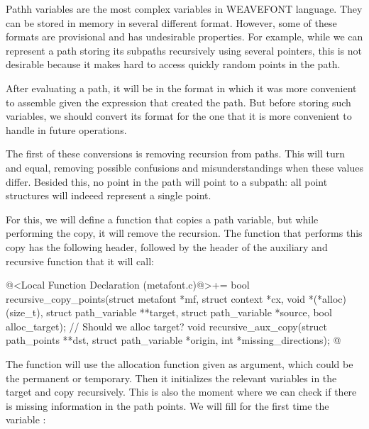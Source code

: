 
Pathh variables are the most complex variables in WEAVEFONT
language. They can be stored in memory in several different
format. However, some of these formats are provisional and has
undesirable properties. For example, while we can represent a path
storing its subpaths recursively using several pointers, this is not
desirable because it makes hard to access quickly random points in the
path.

After evaluating a path, it will be in the format in which it was more
convenient to assemble given the expression that created the path. But
before storing such variables, we should convert its format for the
one that it is more convenient to handle in future operations.

The first of these conversions is removing recursion from paths. This
will turn  and  equal,
removing possible confusions and misunderstandings when these values
differ. Besided this, no point in the path will point to a subpath:
all point structures will indeeed represent a single point.

For this, we will define a function that copies a path variable, but
while performing the copy, it will remove the recursion. The function
that performs this copy has the following header, followed by the
header of the auxiliary and recursive function that it will call:

\iniciocodigo
@<Local Function Declaration (metafont.c)@>+=
bool recursive_copy_points(struct metafont *mf, struct context *cx,
                           void *(*alloc)(size_t),
                           struct path_variable **target,
                           struct path_variable *source,
                           bool alloc_target); // Should we alloc target?
void recursive_aux_copy(struct path_points **dst,
                        struct path_variable *origin, int *missing_directions);
@
\fimcodigo

The function will use the allocation function given as argument, which
could be the permanent or temporary. Then it initializes the relevant
variables in the target and copy recursively. This is also the moment
where we can check if there is missing information in the path
points. We will fill for the first time the
variable :

